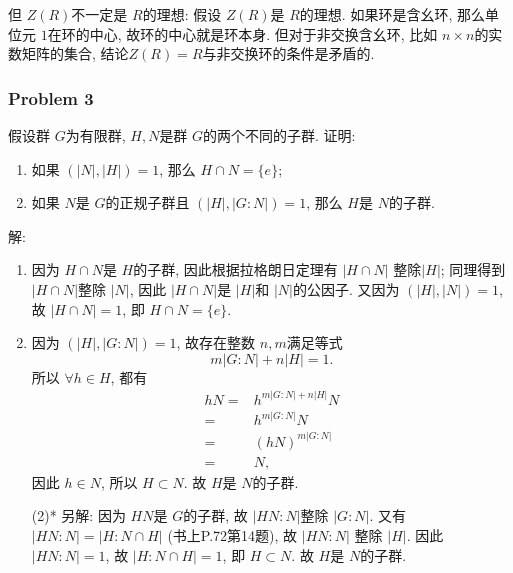 \documentclass[a4paper,12pt]{ctexart}
\begin{document}
    但 $ Z(R) $不一定是 $ R $的理想: 假设 $ Z(R) $是 $ R $的理想. 如果环是含幺环, 
    那么单位元 $ 1 $在环的中心, 故环的中心就是环本身. 
    但对于非交换含幺环, 比如 $ n\times n $的实数矩阵的集合, 结论$ Z(R) = R $与非交换环的条件是矛盾的. 
    

    \subsubsection*{Problem 3} 
    假设群 $ G $为有限群,  $ H,N $是群 $ G $的两个不同的子群. 证明:
    \begin{enumerate}[label=(\arabic{*})]
      \item 如果 $ (|N|,|H|)=1 $, 那么 $ H\cap N = \{e\} $;
      \item 如果 $ N $是 $ G $的正规子群且 $ (|H|,|G:N|)=1 $, 那么 $ H $是 $ N $的子群.
    \end{enumerate}

    解:\begin{enumerate}[label=(\arabic{*})]
      \item 因为 $ H\cap N $是 $ H $的子群, 因此根据拉格朗日定理有 $ |H\cap N| $ 整除$ |H| $; 
      同理得到 $ |H\cap N| $整除 $ |N| $, 因此 $ |H\cap N| $是 $ |H| $和 $ |N| $的公因子. 又因为 $ (|H|,|N|)=1 $, 
      故 $ |H\cap N|=1 $, 即 $ H\cap N=\{e\} $. 
      \item 因为 $ (|H|,|G:N|)=1 $, 故存在整数 $ n,m $满足等式
      \[m|G:N|+n|H| = 1.\]
      所以 $ \forall h\in H $, 都有
      \begin{align*}
        hN =& h^{m|G:N|+n|H| }N\\
           =& h^{m|G:N|}N\\
           =& (hN)^{m|G:N|}\\
           =& N,
      \end{align*}
      因此 $ h\in N $, 所以 $ H\subset N $. 故 $ H $是 $ N $的子群.
      \item[(2)*] 另解: 因为 $ HN $是 $ G $的子群, 故 $ |HN:N| $整除 $ |G:N| $. 又有
      $ |HN:N|=|H:N\cap H| $ (书上P.72第14题), 故 $ |HN:N| $ 整除 $ |H| $. 因此 $ |HN:N|=1 $, 故 $ |H:N\cap H|=1 $, 即 $ H\subset N $. 
      故 $ H $是 $ N $的子群.
    \end{enumerate}
\end{document}
